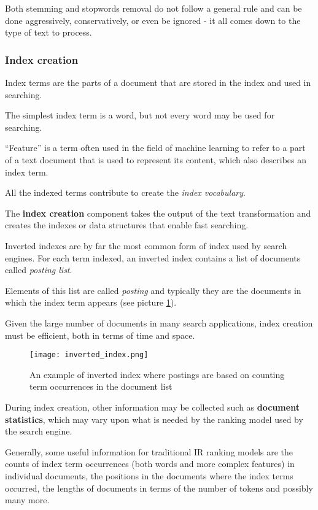 Both stemming and stopwords removal do not follow a general rule and can be done aggressively, conservatively, or even be ignored - it all comes down to the type of text to process.

\subsubsection{Index creation}

Index terms are the parts of a document that are stored in the index and used in searching.

The simplest index term is a word, but not every word may be used for searching.

``Feature'' is a term often used in the field of machine learning to refer to a part of a text document that is used to represent its content, which also describes an index term.

All the indexed terms contribute to create the \textit{index vocabulary}.

The \textbf{index creation} component takes the output of the text transformation and creates the indexes or data structures that enable fast searching.

Inverted indexes are by far the most common form of index used by search engines. For each term indexed, an inverted index contains a list of documents called \textit{posting list}.

Elements of this list are called \textit{posting} and typically they are the documents in which the index term appears (see picture \ref{fig:inverted_index}).

Given the large number of documents in many search applications, index creation must be efficient, both in terms of time and space.

\begin{figure}
  \centering
  \texttt{[image: inverted\_index.png]}
  \caption{An example of inverted index where postings are based on counting term occurrences in the document list}
  \label{fig:inverted_index}
\end{figure}

During index creation, other information may be collected such as \textbf{document statistics}, which may vary upon what is needed by the ranking model used by the search engine.

Generally, some useful information for traditional IR ranking models are the counts of index term occurrences (both words and more complex features) in individual documents, the positions in the documents where the index terms occurred, the lengths of documents in terms of the number of tokens and possibly many more.

